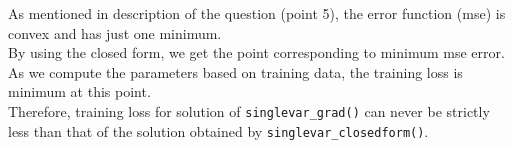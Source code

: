 \documentclass[12pt, fleqn]{article}
\begin{document}
\subsubsection{}
As mentioned in description of the question (point 5), the error function (mse) is convex and has just one minimum. \\
By using the closed form, we get the point corresponding to minimum mse error. As we compute the parameters based on training data, the training loss is minimum at this point. \\
Therefore, training loss for solution of \verb!singlevar_grad()! can never be strictly less than that of the solution obtained by \verb!singlevar_closedform()!.
\end{document}
